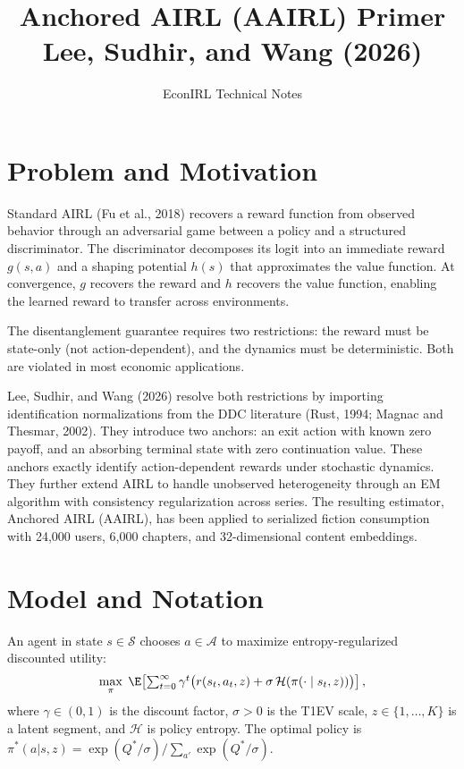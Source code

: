 \documentclass[11pt]{article}
\title{Anchored AIRL (AAIRL) Primer\\[2pt]
\large Lee, Sudhir, and Wang (2026)}
\author{EconIRL Technical Notes}
\date{}
\begin{document}
\maketitle
\vspace{-1em}

\section{Problem and Motivation}

Standard AIRL (Fu et al., 2018) recovers a reward function from observed behavior through an adversarial game between a policy and a structured discriminator. The discriminator decomposes its logit into an immediate reward $g(s,a)$ and a shaping potential $h(s)$ that approximates the value function. At convergence, $g$ recovers the reward and $h$ recovers the value function, enabling the learned reward to transfer across environments.

The disentanglement guarantee requires two restrictions: the reward must be state-only (not action-dependent), and the dynamics must be deterministic. Both are violated in most economic applications.

Lee, Sudhir, and Wang (2026) resolve both restrictions by importing identification normalizations from the DDC literature (Rust, 1994; Magnac and Thesmar, 2002). They introduce two anchors: an exit action with known zero payoff, and an absorbing terminal state with zero continuation value. These anchors exactly identify action-dependent rewards under stochastic dynamics. They further extend AIRL to handle unobserved heterogeneity through an EM algorithm with consistency regularization across series. The resulting estimator, Anchored AIRL (AAIRL), has been applied to serialized fiction consumption with 24,000 users, 6,000 chapters, and 32-dimensional content embeddings.


\section{Model and Notation}

An agent in state $s \in \mathcal{S}$ chooses $a \in \mathcal{A}$ to maximize entropy-regularized discounted utility:
\begin{equation}
\label{eq:objective}
\max_\pi \; \E\!\left[\textstyle\sum_{t=0}^{\infty} \gamma^t \bigl(r(s_t, a_t, z) + \sigma\,\mathcal{H}(\pi(\cdot \mid s_t, z))\bigr)\right],
\end{equation}
where $\gamma \in (0,1)$ is the discount factor, $\sigma > 0$ is the T1EV scale, $z \in \{1,\ldots,K\}$ is a latent segment, and $\mathcal{H}$ is policy entropy. The optimal policy is $\pi^*(a|s,z) = \exp(Q^*/\sigma) / \sum_{a'} \exp(Q^*/\sigma)$.
\end{document}
